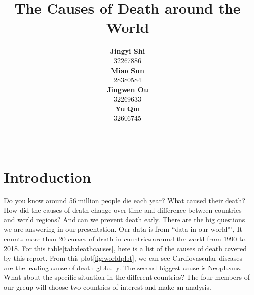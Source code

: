 \documentclass[11pt,a4paper,]{article}
\title{The Causes of Death around the World}
\author{\sf\Large\textbf{ Jingyi Shi}\\ {\sf\large 32267886\\[0.5cm]} \sf\Large\textbf{ Miao Sun}\\ {\sf\large 28380584\\[0.5cm]} \sf\Large\textbf{ Jingwen Ou}\\ {\sf\large 32269633\\[0.5cm]} \sf\Large\textbf{ Yu Qin}\\ {\sf\large 32606745\\[0.5cm]}}
\date{\sf\Date~\Month~\Year}
\makeatletter
\def\titlepage{\front{\expandafter{\@title}}{\@author}{\@organization}}
\makeatother
\begin{document}
\titlepage

\clearpage

\hypertarget{introduction}{%
\section{Introduction}\label{introduction}}

Do you know around 56 million people die each year? What caused their death? How did the causes of death change over time and difference between countries and world regions? And can we prevent death early. There are the big questions we are answering in our presentation. Our data is from ``data in our world''', It counts more than 20 causes of death in countries around the world from 1990 to 2018. For this table\ref{tab:deathcauses}, here is a list of the causes of death covered by this report. From this plot\ref{fig:worldplot}, we can see Cardiovascular diseases are the leading cause of death globally. The second biggest cause is Neoplasms. What about the specific situation in the different countries? The four members of our group will choose two countries of interest and make an analysis.
\end{document}
